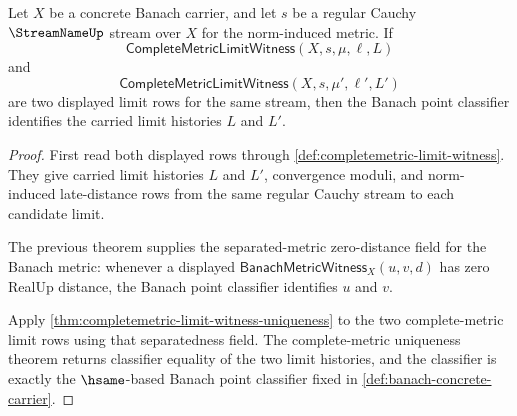 \begin{theorem}
\label{thm:banach-limit-uniqueness}
Let $X$ be a concrete Banach carrier, and let $s$ be a regular Cauchy
$\StreamNameUp$ stream over $X$ for the norm-induced metric. If
$$
\mathsf{CompleteMetricLimitWitness}(X,s,\mu,\ell,L)
$$
and
$$
\mathsf{CompleteMetricLimitWitness}(X,s,\mu',\ell',L')
$$
are two displayed limit rows for the same stream, then the Banach point
classifier identifies the carried limit histories $L$ and $L'$.
\end{theorem}
\begin{proof}
First read both displayed rows through
\autoref{def:completemetric-limit-witness}. They give carried limit histories
$L$ and $L'$, convergence moduli, and norm-induced late-distance rows from
the same regular Cauchy stream to each candidate limit.

The previous theorem supplies the separated-metric zero-distance field for
the Banach metric: whenever a displayed
$\mathsf{BanachMetricWitness}_X(u,v,d)$ has zero RealUp distance, the Banach
point classifier identifies $u$ and $v$.

Apply
\autoref{thm:completemetric-limit-witness-uniqueness} to the two
complete-metric limit rows using that separatedness field. The complete-metric
uniqueness theorem returns classifier equality of the two limit histories, and
the classifier is exactly the $\hsame$-based Banach point classifier fixed in
\autoref{def:banach-concrete-carrier}.
\end{proof}

